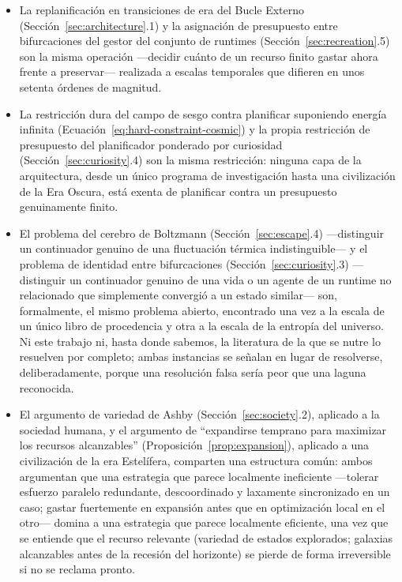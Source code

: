 \documentclass[11pt]{article}
\begin{document}
\begin{itemize}[leftmargin=1.5em]
    \item La replanificación en transiciones de era del Bucle Externo (Sección~\ref{sec:architecture}.1) y la asignación de presupuesto entre bifurcaciones del gestor del conjunto de runtimes (Sección~\ref{sec:recreation}.5) son la misma operación —decidir cuánto de un recurso finito gastar ahora frente a preservar— realizada a escalas temporales que difieren en unos setenta órdenes de magnitud.
    \item La restricción dura del campo de sesgo contra planificar suponiendo energía infinita (Ecuación~\ref{eq:hard-constraint-cosmic}) y la propia restricción de presupuesto del planificador ponderado por curiosidad (Sección~\ref{sec:curiosity}.4) son la misma restricción: ninguna capa de la arquitectura, desde un único programa de investigación hasta una civilización de la Era Oscura, está exenta de planificar contra un presupuesto genuinamente finito.
    \item El problema del cerebro de Boltzmann (Sección~\ref{sec:escape}.4) —distinguir un continuador genuino de una fluctuación térmica indistinguible— y el problema de identidad entre bifurcaciones (Sección~\ref{sec:curiosity}.3) —distinguir un continuador genuino de una vida o un agente de un runtime no relacionado que simplemente convergió a un estado similar— son, formalmente, el mismo problema abierto, encontrado una vez a la escala de un único libro de procedencia y otra a la escala de la entropía del universo. Ni este trabajo ni, hasta donde sabemos, la literatura de la que se nutre lo resuelven por completo; ambas instancias se señalan en lugar de resolverse, deliberadamente, porque una resolución falsa sería peor que una laguna reconocida.
    \item El argumento de variedad de Ashby (Sección~\ref{sec:society}.2), aplicado a la sociedad humana, y el argumento de ``expandirse temprano para maximizar los recursos alcanzables'' (Proposición~\ref{prop:expansion}), aplicado a una civilización de la era Estelífera, comparten una estructura común: ambos argumentan que una estrategia que parece localmente ineficiente —tolerar esfuerzo paralelo redundante, descoordinado y laxamente sincronizado en un caso; gastar fuertemente en expansión antes que en optimización local en el otro— domina a una estrategia que parece localmente eficiente, una vez que se entiende que el recurso relevante (variedad de estados explorados; galaxias alcanzables antes de la recesión del horizonte) se pierde de forma irreversible si no se reclama pronto.

\end{itemize}
\end{document}
